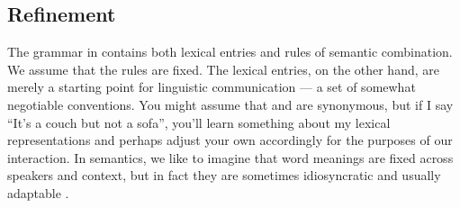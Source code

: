 \documentclass[leqno]{article}
\begin{document}

\subsection{Refinement}\label{sec:refine}


The grammar in  contains both lexical entries and
rules of semantic combination. We assume that the rules are fixed.
The lexical entries, on the other hand, are merely a starting point
for linguistic communication --- a set of somewhat negotiable
conventions. You might assume that  and  are
synonymous, but if I say ``It's a couch but not a sofa'', you'll learn
something about my lexical representations and perhaps adjust your own
accordingly for the purposes of our interaction. In semantics, we like
to imagine that word meanings are fixed across speakers and context,
but in fact they are sometimes idiosyncratic and usually adaptable
\citep{Clark97}. 

%
\end{document}
